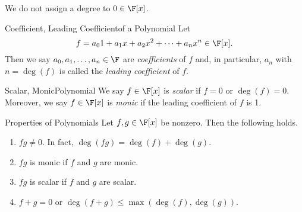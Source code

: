 \documentclass[linearalgebraII]{subfiles}
\begin{document}
    \begin{remark}
        We do not assign a degree to $0\in \F[x]$.
    \end{remark}

    \begin{definition}{Coefficient, Leading Coefficient}{of a Polynomial}
        Let
        \begin{equation*}
            f = a_0 1+ a_1x + a_2x^2 + \cdots + a_nx^n\in \F[x].
        \end{equation*}
        Then we say $a_0, a_1, \ldots, a_n\in \F$ are \emph{coefficients} of $f$ and, in particular, $a_n$ with $n=\deg(f)$ is called the \emph{leading coefficient} of $f$.
    \end{definition}

    \begin{definition}{Scalar, Monic}{Polynomial}
        We say $f\in \F[x]$ is \emph{scalar} if $f=0$ or $\deg(f) = 0$. Moreover, we say $f\in\F[x]$ is \emph{monic} if the leading coefficient of $f$ is 1. 
    \end{definition}

    \begin{prop}{Properties of Polynomials}
        Let $f, g\in \F[x]$ be nonzero. Then the following holds.
        \begin{enumerate}
            \item $fg\neq 0$. In fact, $\deg(fg) = \deg(f)+\deg(g)$.

            \item $fg$ is monic if $f$ and $g$ are monic.

            \item $fg$ is scalar if $f$ and $g$ are scalar.

            \item $f+g = 0$ or $\deg(f+g)\leq \max \left( \deg(f), \deg(g) \right)$.
             
        \end{enumerate}
    \end{prop}
\end{document}
